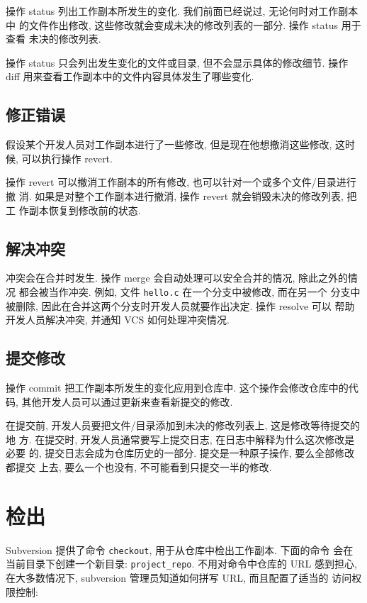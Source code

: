 \documentclass[nofonts, oneside]{ctexbook}
\newcommand\svn{\texttt{svn}}
\begin{document}
操作 status 列出工作副本所发生的变化. 我们前面已经说过, 无论何时对工作副本中
的文件作出修改, 这些修改就会变成未决的修改列表的一部分. 操作 status 用于查看
未决的修改列表.

操作 status 只会列出发生变化的文件或目录, 但不会显示具体的修改细节. 操作
diff 用来查看工作副本中的文件内容具体发生了哪些变化.

\section{修正错误}
\label{sec:fix_mistakes}

假设某个开发人员对工作副本进行了一些修改, 但是现在他想撤消这些修改, 这时候,
可以执行操作 revert.

操作 revert 可以撤消工作副本的所有修改, 也可以针对一个或多个文件/目录进行撤
消. 如果是对整个工作副本进行撤消, 操作 revert 就会销毁未决的修改列表, 把工
作副本恢复到修改前的状态.

\section{解决冲突}
\label{sec:resolve_conflicts}

冲突会在合并时发生. 操作 merge 会自动处理可以安全合并的情况, 除此之外的情况
都会被当作冲突. 例如, 文件 \texttt{hello.c} 在一个分支中被修改, 而在另一个
分支中被删除, 因此在合并这两个分支时开发人员就要作出决定. 操作 resolve 可以
帮助开发人员解决冲突, 并通知 VCS 如何处理冲突情况.

\section{提交修改}
\label{sec:commit_changes}

操作 commit 把工作副本所发生的变化应用到仓库中. 这个操作会修改仓库中的代码,
其他开发人员可以通过更新来查看新提交的修改.

在提交前, 开发人员要把文件/目录添加到未决的修改列表上, 这是修改等待提交的地
方. 在提交时, 开发人员通常要写上提交日志, 在日志中解释为什么这次修改是必要
的, 提交日志会成为仓库历史的一部分. 提交是一种原子操作, 要么全部修改都提交
上去, 要么一个也没有, 不可能看到只提交一半的修改.

\chapter{检出}
\label{chap:checkout_process}

Subversion 提供了命令 \texttt{checkout}, 用于从仓库中检出工作副本. 下面的命令
会在当前目录下创建一个新目录: \texttt{project\_repo}. 不用对命令中仓库的 URL
感到担心, 在大多数情况下, subversion 管理员知道如何拼写 URL, 而且配置了适当的
访问权限控制:
\end{document}

